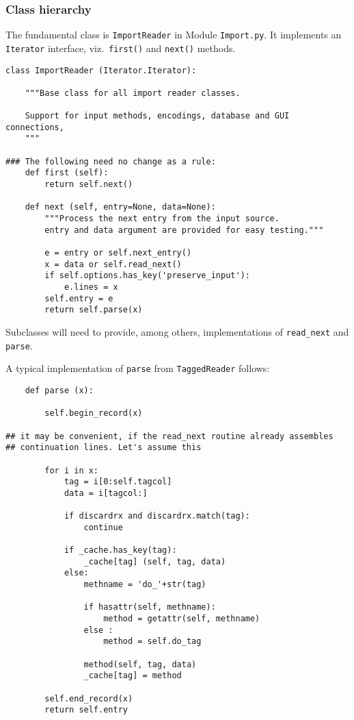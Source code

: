 \subsubsection{Class hierarchy}

The fundamental class is \texttt{ImportReader} in Module
\texttt{Import.py}. It implements an \texttt{Iterator} interface,
viz.\ \texttt{first()} and  \texttt{next()} methods. 

\begin{verbatim}
class ImportReader (Iterator.Iterator):

    """Base class for all import reader classes.

    Support for input methods, encodings, database and GUI connections, 
    """

### The following need no change as a rule:
    def first (self):
        return self.next()

    def next (self, entry=None, data=None):
        """Process the next entry from the input source.
        entry and data argument are provided for easy testing."""

        e = entry or self.next_entry()
        x = data or self.read_next()
        if self.options.has_key('preserve_input'):
            e.lines = x
        self.entry = e
        return self.parse(x)

\end{verbatim}

Subclasses will need to provide, among others, implementations of
\texttt{read\_next} and \texttt{parse}.

A typical implementation of \texttt{parse} from \texttt{TaggedReader}
follows: 
\begin{verbatim}
    def parse (x):

        self.begin_record(x)
       
## it may be convenient, if the read_next routine already assembles
## continuation lines. Let's assume this

        for i in x:
            tag = i[0:self.tagcol]
            data = i[tagcol:]

            if discardrx and discardrx.match(tag):
                continue
                      
            if _cache.has_key(tag):
                _cache[tag] (self, tag, data)
            else:
                methname = 'do_'+str(tag)

                if hasattr(self, methname):
                    method = getattr(self, methname)
                else :
                    method = self.do_tag
                    
                method(self, tag, data)
                _cache[tag] = method

        self.end_record(x)
        return self.entry

\end{verbatim}


